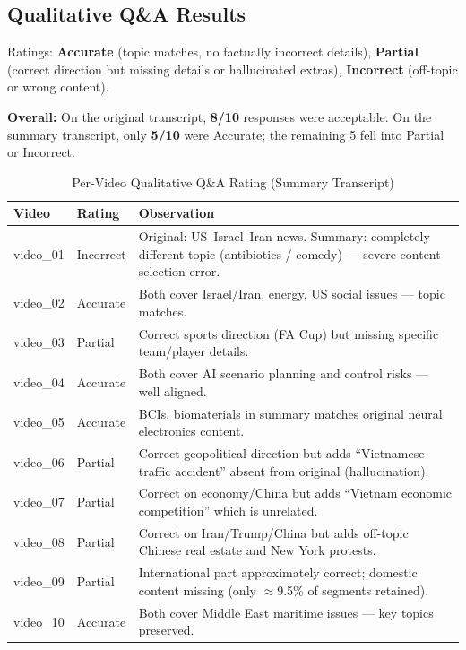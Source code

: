 \documentclass[10pt,conference]{IEEEtran}
\begin{document}
\subsection{Qualitative Q\&A Results}

Ratings: \textbf{Accurate} (topic matches, no factually incorrect details),
\textbf{Partial} (correct direction but missing details or hallucinated extras),
\textbf{Incorrect} (off-topic or wrong content).

\textbf{Overall:} On the original transcript, \textbf{8/10} responses were
acceptable. On the summary transcript, only \textbf{5/10} were Accurate; the
remaining 5 fell into Partial or Incorrect.

\begin{table}[H]
\centering
\caption{Per-Video Qualitative Q\&A Rating (Summary Transcript)}
\label{tab:qa_detail}
\begin{tabular}{p{1.1cm}p{1.3cm}p{5.0cm}}
\toprule
\textbf{Video} & \textbf{Rating} & \textbf{Observation} \\
\midrule
video\_01 & Incorrect
  & Original: US--Israel--Iran news. Summary: completely different topic
    (antibiotics / comedy) --- severe content-selection error. \\
video\_02 & Accurate
  & Both cover Israel/Iran, energy, US social issues --- topic matches. \\
video\_03 & Partial
  & Correct sports direction (FA Cup) but missing specific team/player
    details. \\
video\_04 & Accurate
  & Both cover AI scenario planning and control risks --- well aligned. \\
video\_05 & Accurate
  & BCIs, biomaterials in summary matches original neural electronics
    content. \\
video\_06 & Partial
  & Correct geopolitical direction but adds ``Vietnamese traffic accident''
    absent from original (hallucination). \\
video\_07 & Partial
  & Correct on economy/China but adds ``Vietnam economic competition''
    which is unrelated. \\
video\_08 & Partial
  & Correct on Iran/Trump/China but adds off-topic Chinese real estate
    and New York protests. \\
video\_09 & Partial
  & International part approximately correct; domestic content missing
    (only $\approx$9.5\% of segments retained). \\
video\_10 & Accurate
  & Both cover Middle East maritime issues --- key topics preserved. \\
\bottomrule
\end{tabular}
\end{table}
\end{document}
